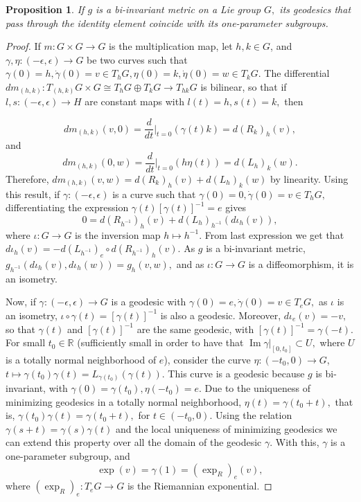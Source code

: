 \documentclass[12pt, letterpaper, reqno]{amsart}
\theoremstyle{definition}
\theoremstyle{plain}
\newtheorem{prop}{Proposition}
\theoremstyle{remark}
\begin{document}
\begin{prop}\label{prop:essential_fact1}
	If $ g $ is a bi-invariant metric on a Lie group $ G, $ its geodesics that pass through the identity element coincide with its one-parameter subgroups.
\end{prop}
\begin{proof}
	If $ m: G\times G \rightarrow G $ is the multiplication map, let $ h,k\in G $, and $ \gamma,\eta: \left( -\epsilon,\epsilon \right) \rightarrow G $ be two curves such that $ \gamma(0)=h, \dot{\gamma}(0)=v \in T_hG,\eta(0)=k,\dot{\eta}(0)=w\in T_kG. $ The differential $ dm_{(h,k)}: T_{(h,k)}G\times G\cong T_hG\oplus T_kG \rightarrow T_{hk} G $ is bilinear, so that if $ l,s: \left( -\epsilon,\epsilon \right) \rightarrow H $ are constant maps with $ l(t)=h,s(t)=k, $ then

	$$ dm_{(h,k)}(v,0)= \frac{d}{dt} \Big|_{t=0} \left( \gamma(t) k \right) = d(R_k)_h(v), $$ 
	and
	$$ dm_{(h,k)}(0,w) = \frac{d}{dt} \Big|_{t=0}\left( h\eta(t) \right) = d(L_h)_k(w). $$ 
	Therefore, $ dm_{(h,k)}(v,w) = d(R_k)_h(v)+ d(L_h)_k(w)  $ by linearity.  Using this result, if $ \gamma: \left( -\epsilon,\epsilon \right)  $ is a curve such that $ \gamma(0)=0, \dot{\gamma}(0)=v\in T_hG, $ differentiating the expression $ \gamma(t) \left[ \gamma(t) \right]^{-1}=e $ gives
	$$ 0 = d(R_{h^{-1}})_h(v)+d(L_h)_{h^{-1}} \left( d\iota_h(v) \right),  $$ 
	where $ \iota: G \rightarrow G $ is the inversion map $ h \mapsto h^{-1}. $ From last expression we get that $ d\iota_h(v)=-d(L_{h^{-1}})_e\circ d(R_{h^{-1}})_h(v) $. As $ g $ is a bi-invariant metric, $ g_{h^{-1}}(d\iota_h(v),d\iota_h(w)) = g_h(v,w), $ and as $ \iota: G \rightarrow G $ is a diffeomorphism, it is an isometry. 

	Now, if $ \gamma: \left( -\epsilon,\epsilon \right) \rightarrow G $ is a geodesic with $ \gamma(0)=e,\dot{\gamma}(0)=v\in T_eG, $ as $ \iota $ is an isometry, $ \iota\circ\gamma(t)= \left[ \gamma(t) \right]^{-1} $ is also a geodesic. Moreover, $ d\iota_e(v)=-v, $ so that $ \gamma(t) $ and $ \left[ \gamma(t) \right]^{-1} $ are the same geodesic, with $ \left[ \gamma(t) \right]^{-1} = \gamma(-t).  $ For small $ t_0\in \mathbb{R} $ (sufficiently small in order to have that $ \operatorname{Im} \gamma|_{[0,t_0]}\subset U,  $ where $ U $ is a totally normal neighborhood of $ e $), consider the curve $ \eta:(-t_0,0) \rightarrow G $, $ t \mapsto  \gamma(t_0)\gamma(t)= L_{\gamma(t_0)}(\gamma(t)) $. This curve is a geodesic because $ g $ is bi-invariant, with $ \gamma(0)=\gamma(t_0), \eta(-t_0)=e. $ Due to the uniqueness of minimizing geodesics in a totally normal neighborhood, $ \eta(t)=\gamma(t_0+t), $ that is, $ \gamma(t_0)\gamma(t)= \gamma(t_0+t), $ for $ t\in (-t_0,0). $  Using the relation $ \gamma(s+t)=\gamma(s)\gamma(t) $  and the local uniqueness of minimizing geodesics we can extend this property over all the domain of the geodesic $ \gamma. $ With this, $ \gamma $ is a one-parameter subgroup, and
	$$ \operatorname{exp} (v)=\gamma(1)= (\operatorname{exp}_R)_e(v),  $$ 
	where $ (\operatorname{exp}_R)_e : T_eG \rightarrow G  $ is the Riemannian exponential.
\end{proof}
\end{document}
